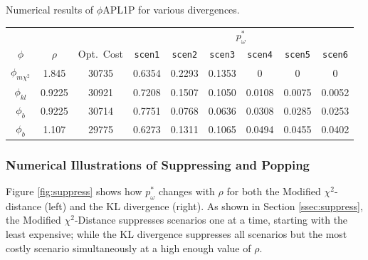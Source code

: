 \documentclass[opre,nonblindrev]{informs3} %
\begin{document}
\begin{table}
	\TABLE
	{
		Numerical results of $\phi$APL1P for various divergences.
		\label{tb:numerical_results}
	}
	{\begin{tabular}{ccccccccc}
		\hline
		       &  		  & 				 & \multicolumn{6}{c}{$p_{\omega}^*$} \\
		\cline{4-9}
		$\phi$ & $\rho$  & Opt.\ Cost  & \texttt{scen1} & \texttt{scen2} & \texttt{scen3} & \texttt{scen4} & \texttt{scen5} & \texttt{scen6} \\
 		\hline
		$\phi_{m\chi^2}$ &  1.845  & 30735 &  0.6354 & 0.2293 & 0.1353 & 0      & 0      & 0 \\
		$\phi_{kl}$      &  0.9225 & 30921 &  0.7208 & 0.1507 & 0.1050 & 0.0108 & 0.0075 & 0.0052 \\
		$\phi_b$         &  0.9225 & 30714 & 0.7751 & 0.0768 & 0.0636 & 0.0308 & 0.0285 & 0.0253 \\
		\hline
		$\phi_b$         &  1.107  & 29775 & 0.6273 & 0.1311 & 0.1065  & 0.0494 & 0.0455 & 0.0402 \\
		\hline
	\end{tabular}}
	{}
\end{table}

\subsubsection{Numerical Illustrations of Suppressing and Popping}
\label{ssec:numerical_pop_suppress}





Figure \ref{fig:suppress} shows how $p^*_\omega$ changes with $\rho$ for both the Modified $\chi^2$-distance (left) and the KL divergence (right).
As shown in Section \ref{ssec:suppress}, the Modified $\chi^2$-Distance suppresses scenarios one at a time, starting with the least expensive; while the KL divergence suppresses all scenarios but the most costly scenario simultaneously at a high enough value of $\rho$.
\end{document}
